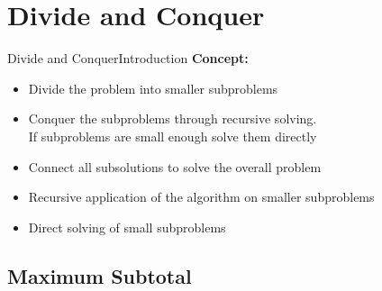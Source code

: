 \section{Divide and Conquer}


\begin{frame}{Divide and Conquer}{Introduction}
  \textbf{Concept:}
  \begin{itemize}
    \item<2->
      {\color{Mittel-Blau}Divide} the problem into smaller subproblems
    \item<3->
      {\color{Mittel-Blau}Conquer} the subproblems through recursive solving.\\
      If subproblems are small enough solve them directly
    \item<4->
      {\color{Mittel-Blau}Connect} all subsolutions to solve the overall problem
  \end{itemize}
  \vspace{1.0em}
  \begin{itemize}
    \item<5->
      {\color{Mittel-Blau}Recursive} application of the algorithm on smaller
      subproblems
    \item<6->
      {\color{Mittel-Blau}Direct} solving of small subproblems
  \end{itemize}
\end{frame}


\subsection{Maximum Subtotal}

